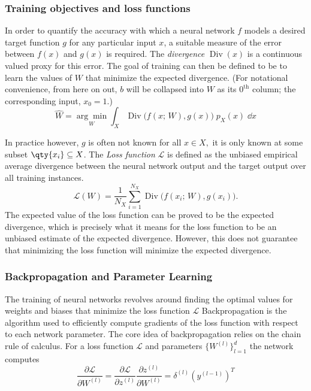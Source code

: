         \subsubsection{Training objectives and loss functions}
            In order to quantify the accuracy with which a neural network \(f\) models a desired target function \(g\) for any particular input \(x\), a suitable measure of the error between \(f(x)\) and \(g(x)\) is required.
            The \emph{divergence} \(\operatorname{Div}(x)\) is a continuous valued proxy for this error.
            The goal of training can then be defined to be to learn the values of \(W\) that minimize the expected divergence.
            (For notational convenience, from here on out, \(b\) will be collapsed into \(W\) as its \(0^{\textrm{th}}\) column;
            the corresponding input, \(x_0 = 1\).)
            \begin{equation}
                \widehat{W} = \underset{W}{\arg\min}\int_X \operatorname{Div}\Big(f(x;\,W), g(x)\Big)\;p_X(x)\;\dd x
            \end{equation}

            In practice however, \(g\) is often not known for all \(x\in X,\) it is only known at some subset \(\qty{x_i}\subseteq X\).
            The \emph{Loss function} \(\mathcal{L}\) is defined as the unbiased empirical average divergence between the neural network output and the target output over all training instances.
            \begin{equation}
                \mathcal{L}(W) = \frac{1}{N_X}\sum_{i=1}^{N_X}\operatorname{Div}\Big(f(x_i;\,W), g(x_i)\Big).
            \end{equation}
            The expected value of the loss function can be proved to be the expected divergence, which is precisely what it means for the loss function to be an unbiased estimate of the expected divergence.
            However, this does not guarantee that minimizing the loss function will minimize the expected divergence.
        \subsubsection{Backpropagation and Parameter Learning}
            The training of neural networks revolves around finding the optimal values for weights and biases that minimize the loss function \(\mathcal{L}\)
            Backpropagation is the algorithm used to efficiently compute gradients of the loss function with respect to each network parameter.
            The core idea of backpropagation relies on the chain rule of calculus.
            For a loss function \(\mathcal{L}\) and parameters \(\{W^{(l)}\}_{l=1}^d\) the network computes
            \begin{equation}
            \frac{\partial \mathcal{L}}{\partial W^{(l)}} = \frac{\partial \mathcal{L}}{\partial z^{(l)}} \frac{\partial z^{(l)}}{\partial W^{(l)}} = \delta^{(l)} (y^{(l-1)})^T 
            \end{equation}
            
